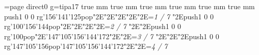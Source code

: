 \chardef\match=\pdfcolorstackinit page direct{0 g}\nopagenumbers\font\ipa=tipa17 true mm true mm true mm true mm true mm true mm
\null\vfill\pdfcolorstack\match push{1 0 0 rg}\ipa\char'156\ipa\char'141\ipa\char'125\pdfcolorstack\match pop{}\ipa\char"2E\enskip\enskip\enskip\enskip\enskip\enskip\enskip\enskip\enskip\ipa\char"2E\enskip\enskip\enskip\ipa\char"2E\enskip\enskip\enskip\enskip\enskip\enskip\enskip\enskip\enskip\bigskip\enskip\enskip\enskip\enskip\enskip\enskip\enskip\enskip\enskip\enskip\enskip\enskip\enskip\enskip\enskip\ipa\char"2E\enskip\enskip\enskip\enskip\enskip\enskip\enskip\enskip\enskip\ipa\char"2E\enskip\enskip\enskip\enskip\enskip\enskip\enskip\enskip\enskip\enskip\enskip\enskip\bigskip\vfill\footline={\hfill\tenrm\it 1 / 7}\eject
\null\vfill\enskip\enskip\enskip\enskip\enskip\enskip\enskip\enskip\enskip\ipa\char"2E\pdfcolorstack\match push{1 0 0 rg}\ipa\char'100\ipa\char'156\ipa\char'144\pdfcolorstack\match pop{}\ipa\char"2E\enskip\enskip\enskip\ipa\char"2E\enskip\enskip\enskip\enskip\enskip\enskip\enskip\enskip\enskip\bigskip\enskip\enskip\enskip\enskip\enskip\enskip\enskip\enskip\enskip\enskip\enskip\enskip\enskip\enskip\enskip\ipa\char"2E\enskip\enskip\enskip\enskip\enskip\enskip\enskip\enskip\enskip\ipa\char"2E\enskip\enskip\enskip\enskip\enskip\enskip\enskip\enskip\enskip\enskip\enskip\enskip\bigskip\vfill\footline={\hfill\tenrm\it 2 / 7}\eject
\null\vfill\enskip\enskip\enskip\enskip\enskip\enskip\enskip\enskip\enskip\ipa\char"2E\enskip\enskip\enskip\enskip\enskip\enskip\enskip\enskip\enskip\ipa\char"2E\pdfcolorstack\match push{1 0 0 rg}\ipa\char'100\pdfcolorstack\match pop{}\ipa\char"2E\enskip\enskip\enskip\enskip\enskip\enskip\enskip\enskip\enskip\bigskip\ipa\char'147\ipa\char'105\ipa\char'156\ipa\char'144\ipa\char'172\ipa\char"2E\enskip\enskip\enskip\enskip\enskip\enskip\enskip\enskip\enskip\ipa\char"2E\enskip\enskip\enskip\enskip\enskip\enskip\enskip\enskip\enskip\enskip\enskip\enskip\bigskip\vfill\footline={\hfill\tenrm\it 3 / 7}\eject
\null\vfill\enskip\enskip\enskip\enskip\enskip\enskip\enskip\enskip\enskip\ipa\char"2E\enskip\enskip\enskip\enskip\enskip\enskip\enskip\enskip\enskip\ipa\char"2E\enskip\enskip\enskip\ipa\char"2E\pdfcolorstack\match push{1 0 0 rg}\ipa\char'147\ipa\char'105\ipa\char'156\pdfcolorstack\match pop{}\bigskip\ipa\char'147\ipa\char'105\ipa\char'156\ipa\char'144\ipa\char'172\ipa\char"2E\enskip\enskip\enskip\enskip\enskip\enskip\enskip\enskip\enskip\ipa\char"2E\enskip\enskip\enskip\enskip\enskip\enskip\enskip\enskip\enskip\enskip\enskip\enskip\bigskip\vfill\footline={\hfill\tenrm\it 4 / 7}\eject

